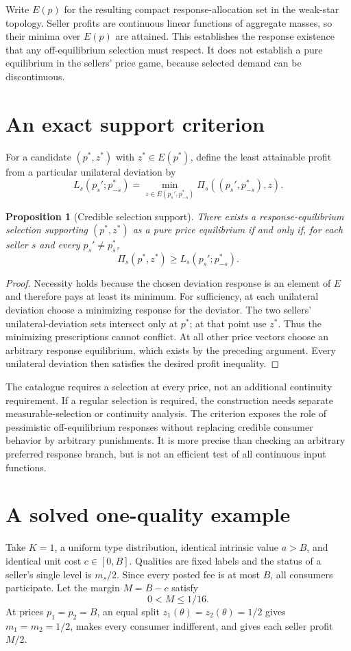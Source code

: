 \documentclass[11pt]{article}
\newtheorem{proposition}{Proposition}
\begin{document}
Write $E(p)$ for the resulting compact response-allocation set in the weak-star topology. Seller profits are continuous linear functions of aggregate masses, so their minima over $E(p)$ are attained. This establishes the response existence that any off-equilibrium selection must respect. It does not establish a pure equilibrium in the sellers' price game, because selected demand can be discontinuous.

\section*{An exact support criterion}
For a candidate $(p^*,z^*)$ with $z^*\in E(p^*)$, define the least attainable profit from a particular unilateral deviation by
\[
 L_s(p_s';p_{-s}^*)=
       \min_{z\in E(p_s',p_{-s}^*)}\Pi_s((p_s',p_{-s}^*),z).
\]
\begin{proposition}[Credible selection support]
There exists a response-equilibrium selection supporting $(p^*,z^*)$ as a pure price equilibrium if and only if, for each seller $s$ and every $p_s'\ne p_s^*$,
\[
                 \Pi_s(p^*,z^*)\geq L_s(p_s';p_{-s}^*).
\]
\end{proposition}
\begin{proof}
Necessity holds because the chosen deviation response is an element of $E$ and therefore pays at least its minimum. For sufficiency, at each unilateral deviation choose a minimizing response for the deviator. The two sellers' unilateral-deviation sets intersect only at $p^*$; at that point use $z^*$. Thus the minimizing prescriptions cannot conflict. At all other price vectors choose an arbitrary response equilibrium, which exists by the preceding argument. Every unilateral deviation then satisfies the desired profit inequality.
\end{proof}
The catalogue requires a selection at every price, not an additional continuity requirement. If a regular selection is required, the construction needs separate measurable-selection or continuity analysis. The criterion exposes the role of pessimistic off-equilibrium responses without replacing credible consumer behavior by arbitrary punishments. It is more precise than checking an arbitrary preferred response branch, but is not an efficient test of all continuous input functions.

\section*{A solved one-quality example}
Take $K=1$, a uniform type distribution, identical intrinsic value $a>B$, and identical unit cost $c\in[0,B]$. Qualities are fixed labels and the status of a seller's single level is $m_s/2$. Since every posted fee is at most $B$, all consumers participate. Let the margin $M=B-c$ satisfy
\[
                             0<M\leq1/16.
\]
At prices $p_1=p_2=B$, an equal split $z_1(\theta)=z_2(\theta)=1/2$ gives $m_1=m_2=1/2$, makes every consumer indifferent, and gives each seller profit $M/2$.
\end{document}

